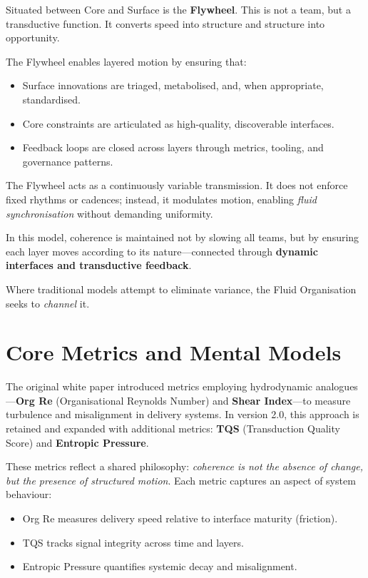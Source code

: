 \documentclass[12pt]{article}
\begin{document}
Situated between Core and Surface is the \textbf{Flywheel}. This is not a team, but a transductive function. It converts speed into structure and structure into opportunity.

The Flywheel enables layered motion by ensuring that:
\begin{itemize}
    \item Surface innovations are triaged, metabolised, and, when appropriate, standardised.
    \item Core constraints are articulated as high-quality, discoverable interfaces.
    \item Feedback loops are closed across layers through metrics, tooling, and governance patterns.
\end{itemize}

The Flywheel acts as a continuously variable transmission. It does not enforce fixed rhythms or cadences; instead, it modulates motion, enabling \textit{fluid synchronisation} without demanding uniformity.

In this model, coherence is maintained not by slowing all teams, but by ensuring each layer moves according to its nature—connected through \textbf{dynamic interfaces and transductive feedback}.

Where traditional models attempt to eliminate variance, the Fluid Organisation seeks to \textit{channel} it.


\section{Core Metrics and Mental Models}

The original white paper introduced metrics employing hydrodynamic analogues—\textbf{Org Re} (Organisational Reynolds Number) and \textbf{Shear Index}—to measure turbulence and misalignment in delivery systems. In version 2.0, this approach is retained and expanded with additional metrics: \textbf{TQS} (Transduction Quality Score) and \textbf{Entropic Pressure}.

These metrics reflect a shared philosophy: \textit{coherence is not the absence of change, but the presence of structured motion}. Each metric captures an aspect of system behaviour:
\begin{itemize}
    \item Org Re measures delivery speed relative to interface maturity (friction).
    \item TQS tracks signal integrity across time and layers.
    \item Entropic Pressure quantifies systemic decay and misalignment.
\end{itemize}
\end{document}
